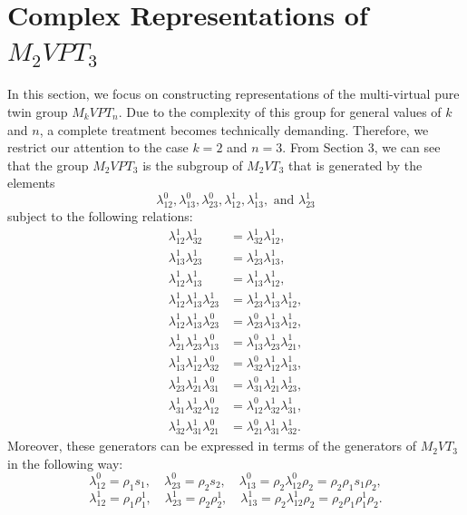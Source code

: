 \documentclass[preprint]{elsarticle}
\begin{document}
\section{Complex Representations of $M_2VPT_3$}
In this section, we focus on constructing representations of the multi-virtual pure twin group $M_kVPT_n$. Due to the complexity of this group for general values of $k$ and $n$, a complete treatment becomes technically demanding. Therefore, we restrict our attention to the case $k = 2$ and $n = 3$. From Section 3, we can see that the group $M_2VPT_3$ is the subgroup of $M_2VT_3$ that is generated by the elements $$\lambda_{12}^0, \lambda_{13}^0, \lambda_{23}^0, \lambda_{12}^{1}, \lambda_{13}^{1}, \text{ and } \lambda_{23}^{1} $$ subject to the following relations:
\begin{align*}
    \lambda_{12}^1 \lambda_{32}^1 &= \lambda_{32}^1 \lambda_{12}^1,\\
    \lambda_{13}^1 \lambda_{23}^1 &= \lambda_{23}^1  \lambda_{13}^1,\\
     \lambda_{12}^1 \lambda_{13}^1 &= \lambda_{13}^1  \lambda_{12}^1,\\
      \lambda_{12}^1 \lambda_{13}^1 \lambda_{23}^1 &= \lambda_{23}^1 \lambda_{13}^1 \lambda_{12}^1,\\
    \lambda_{12}^1 \lambda_{13}^1 \lambda_{23}^0 &= \lambda_{23}^0 \lambda_{13}^1 \lambda_{12}^1,\\
     \lambda_{21}^1 \lambda_{23}^1 \lambda_{13}^0 &= \lambda_{13}^0 \lambda_{23}^1 \lambda_{21}^1,\\
     \lambda_{13}^1 \lambda_{12}^1 \lambda_{32}^0 &= \lambda_{32}^0 \lambda_{12}^1 \lambda_{13}^1,\\
     \lambda_{23}^1 \lambda_{21}^1 \lambda_{31}^0 &= \lambda_{31}^0 \lambda_{21}^1 \lambda_{23}^1,\\
           \lambda_{31}^1 \lambda_{32}^1 \lambda_{12}^0 &= \lambda_{12}^0 \lambda_{32}^1 \lambda_{31}^1,\\
       \lambda_{32}^1 \lambda_{31}^1 \lambda_{21}^0 &= \lambda_{21}^0 \lambda_{31}^1 \lambda_{32}^1.
     \end{align*}
Moreover, these generators can be expressed in terms of the generators of $M_2VT_3$ in the following way:
$$\lambda_{12}^0=\rho_1s_1,\quad \lambda_{23}^0=\rho_2s_2,\quad 
\lambda_{13}^0=\rho_2\lambda_{12}^0\rho_2=\rho_2\rho_1s_1\rho_2,$$
$$\lambda_{12}^1=\rho_1\rho_1^1,\quad \lambda_{23}^1=\rho_2\rho_2^1,\quad \lambda_{13}^1=\rho_2\lambda_{12}^1\rho_2=\rho_2\rho_1\rho_1^1\rho_2.$$
\end{document}
